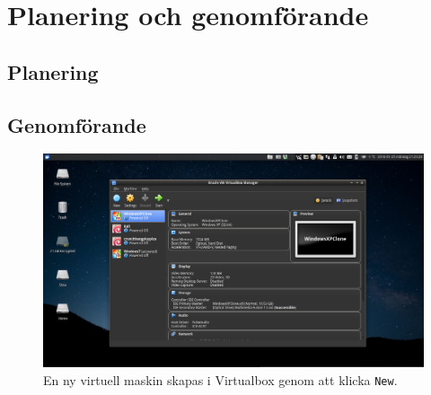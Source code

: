 \section{Planering och genomförande}

\subsection{Planering}

\subsection{Genomförande}


\begin{figure}[htbp]
  \centering
    \includegraphics[width=\linewidth]{img/A_new-01}
    \caption{En ny virtuell maskin skapas i Virtualbox genom att klicka
             \texttt{New}.}
  \label{fig:A_new-01}
\end{figure}

